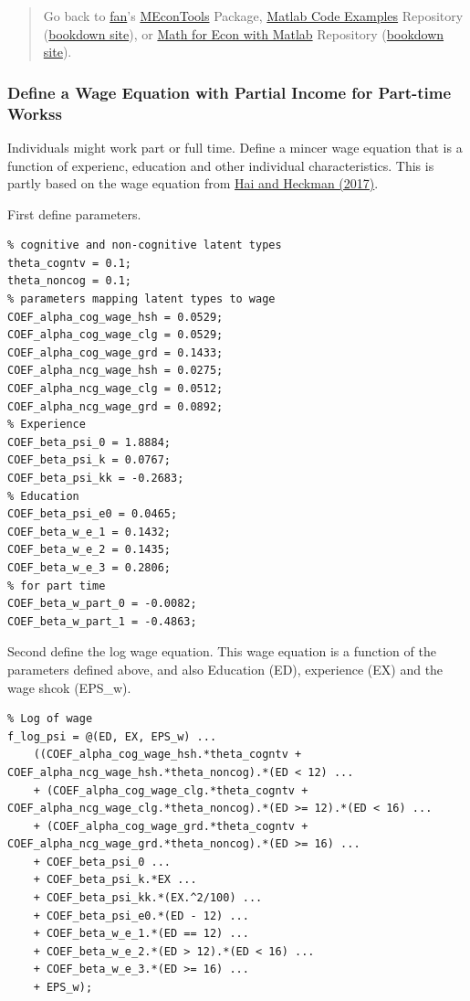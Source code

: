 \documentclass[
]{book}
\begin{document}
\begin{quote}
Go back to \href{http://fanwangecon.github.io/}{fan}'s \href{https://fanwangecon.github.io/MEconTools/}{MEconTools} Package, \href{https://fanwangecon.github.io/M4Econ/}{Matlab Code Examples} Repository (\href{https://fanwangecon.github.io/M4Econ/bookdown}{bookdown site}), or \href{https://fanwangecon.github.io/Math4Econ/}{Math for Econ with Matlab} Repository (\href{https://fanwangecon.github.io/Math4Econ/bookdown}{bookdown site}).
\end{quote}

\hypertarget{define-a-wage-equation-with-partial-income-for-part-time-workss-1}{%
\subsubsection{Define a Wage Equation with Partial Income for Part-time Workss}\label{define-a-wage-equation-with-partial-income-for-part-time-workss-1}}

Individuals might work part or full time. Define a mincer wage equation
that is a function of experienc, education and other individual
characteristics. This is partly based on the wage equation from \href{https://www.sciencedirect.com/science/article/abs/pii/S1094202517300029}{Hai and
Heckman
(2017)}. \citep{HaiHeckman2017}

First define parameters.

\begin{verbatim}
% cognitive and non-cognitive latent types
theta_cogntv = 0.1;
theta_noncog = 0.1;
% parameters mapping latent types to wage
COEF_alpha_cog_wage_hsh = 0.0529;
COEF_alpha_cog_wage_clg = 0.0529;
COEF_alpha_cog_wage_grd = 0.1433;
COEF_alpha_ncg_wage_hsh = 0.0275;
COEF_alpha_ncg_wage_clg = 0.0512;
COEF_alpha_ncg_wage_grd = 0.0892;
% Experience
COEF_beta_psi_0 = 1.8884;
COEF_beta_psi_k = 0.0767;
COEF_beta_psi_kk = -0.2683;
% Education
COEF_beta_psi_e0 = 0.0465;
COEF_beta_w_e_1 = 0.1432;
COEF_beta_w_e_2 = 0.1435;
COEF_beta_w_e_3 = 0.2806;
% for part time
COEF_beta_w_part_0 = -0.0082;
COEF_beta_w_part_1 = -0.4863;
\end{verbatim}

Second define the log wage equation. This wage equation is a function of
the parameters defined above, and also Education (ED), experience (EX)
and the wage shcok (EPS\_w).

\begin{verbatim}
% Log of wage
f_log_psi = @(ED, EX, EPS_w) ...
    ((COEF_alpha_cog_wage_hsh.*theta_cogntv + COEF_alpha_ncg_wage_hsh.*theta_noncog).*(ED < 12) ...
    + (COEF_alpha_cog_wage_clg.*theta_cogntv + COEF_alpha_ncg_wage_clg.*theta_noncog).*(ED >= 12).*(ED < 16) ...
    + (COEF_alpha_cog_wage_grd.*theta_cogntv + COEF_alpha_ncg_wage_grd.*theta_noncog).*(ED >= 16) ...
    + COEF_beta_psi_0 ...
    + COEF_beta_psi_k.*EX ...
    + COEF_beta_psi_kk.*(EX.^2/100) ...
    + COEF_beta_psi_e0.*(ED - 12) ...
    + COEF_beta_w_e_1.*(ED == 12) ...
    + COEF_beta_w_e_2.*(ED > 12).*(ED < 16) ...
    + COEF_beta_w_e_3.*(ED >= 16) ...
    + EPS_w);
\end{verbatim}
\end{document}
